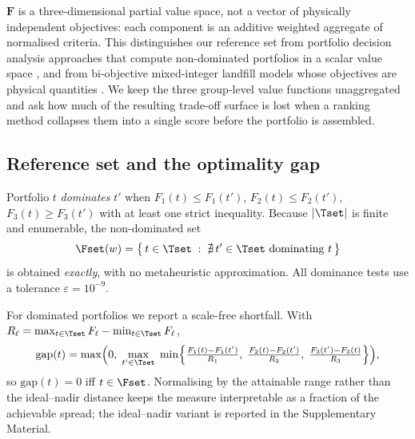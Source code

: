 \begin{remark}
\label{rem:valuespace}
$\mathbf{F}$ is a three-dimensional partial value space, not a vector of
physically independent objectives: each component is an additive weighted
aggregate of normalised criteria.
This distinguishes our reference set from portfolio decision analysis
approaches that compute non-dominated portfolios in a scalar value space
\citep{Liesio2007,Liesio2008,Yang2015}, and from bi-objective mixed-integer
landfill models whose objectives are physical quantities
\citep{EiseltMarianov2014}.
We keep the three group-level value functions unaggregated and ask how
much of the resulting trade-off surface is lost when a ranking method
collapses them into a single score before the portfolio is assembled.
\end{remark}

\subsection{Reference set and the optimality gap}

Portfolio $t$ \emph{dominates} $t'$ when $F_1(t)\le F_1(t')$,
$F_2(t)\le F_2(t')$, $F_3(t)\ge F_3(t')$ with at least one strict
inequality.
Because $|\Tset|$ is finite and enumerable, the non-dominated set
\begin{equation}
  \label{eq:front}
  \Fset(w) = \bigl\{\,t\in\Tset \;:\; \nexists\,t'\in\Tset
    \text{ dominating } t\,\bigr\}
\end{equation}
is obtained \emph{exactly}, with no metaheuristic approximation.
All dominance tests use a tolerance $\varepsilon=10^{-9}$.

For dominated portfolios we report a scale-free shortfall.
With $R_\ell = \max_{t\in\Tset}F_\ell - \min_{t\in\Tset}F_\ell$,
\begin{equation}
  \label{eq:gap}
  \mathrm{gap}(t) = \max\Bigl(0,\;\max_{t'\in\Tset}\;\min\Bigl\{
    \tfrac{F_1(t)-F_1(t')}{R_1},\;
    \tfrac{F_2(t)-F_2(t')}{R_2},\;
    \tfrac{F_3(t')-F_3(t)}{R_3}\Bigr\}\Bigr),
\end{equation}
so $\mathrm{gap}(t)=0$ iff $t\in\Fset$.
Normalising by the attainable range rather than the ideal--nadir distance
keeps the measure interpretable as a fraction of the achievable spread;
the ideal--nadir variant is reported in the Supplementary Material.
